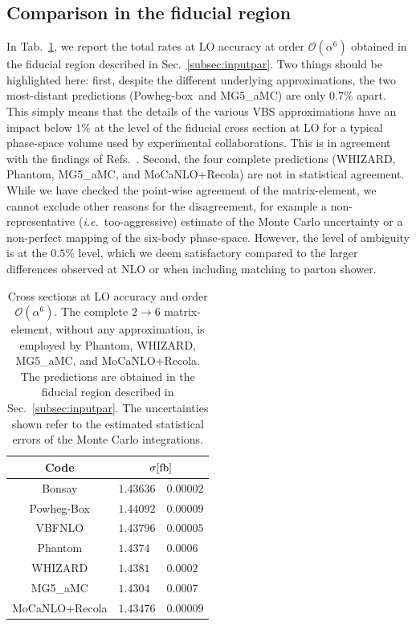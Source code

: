 \documentclass[twocolumn,epjc3]{svjour3} %
\begin{document}
    \subsection{Comparison in the fiducial region}
    In Tab.~\ref{tab:wg1_LOrates}, we report the total rates at LO accuracy at order $\mathcal O (\alpha^6)$ obtained in the fiducial region 
    described in Sec.~\ref{subsec:inputpar}. Two things should be highlighted here: first, despite the different underlying approximations, 
    the two most-distant predictions ({\sc Powheg-box}\ and {\sc MG5\_aMC}) are only $0.7\%$ apart. This simply means that the details 
    of the various VBS approximations have an impact below $1\%$ at the level of the fiducial cross section at LO for a 
    typical phase-space volume used by experimental collaborations. This is in agreement with the findings of 
    Refs.~\cite{Denner:2012dz,Oleari:2003tc}. Second, the four complete predictions ({\sc WHIZARD}, {\sc Phantom}, {\sc MG5\_aMC}, 
    and {\sc MoCaNLO+Recola}) are not in statistical agreement. While we have checked the point-wise agreement of the matrix-element, 
    we cannot exclude other reasons for the disagreement, for example a non-representative (\emph{i.e.}\ too-aggressive) 
    estimate of the Monte Carlo uncertainty or a non-perfect mapping of the six-body phase-space. However, the level of ambiguity is at the $0.5\%$ level, which 
    we deem satisfactory compared to the larger differences observed at NLO or when including matching to parton shower. 
    \begin{table}
        \centering
        \begin{tabular}{c|r@{ $\pm$ }l}
          Code  &  \multicolumn{2}{c}{$\sigma[\rm{fb}]$}  \\
            \hline
            \hline
            {\sc Bonsay}  &  $1.43636$ & $0.00002$ \\
            {\sc Powheg-Box}  &  $1.44092$ & $0.00009$ \\
            {\sc VBFNLO}  &  $1.43796$ & $0.00005$ \\
            {\sc Phantom} &  $1.4374\phantom{0}$ & $0.0006 $  \\
            {\sc WHIZARD} &  $1.4381\phantom{0}$ & $0.0002 $ \\
            {\sc MG5\_aMC}&  $1.4304\phantom{0}$ & $0.0007$ \\
            {\sc MoCaNLO+Recola}  &  $1.43476$ & $0.00009$ 
        \end{tabular}
        \caption{\label{tab:wg1_LOrates} Cross sections at LO accuracy and order $\mathcal{O}(\alpha^6)$.
        The complete $2\to 6$ matrix-element, without any approximation, is employed by {\sc Phantom},
        {\sc WHIZARD}, {\sc MG5\_aMC}, and {\sc MoCaNLO+Recola}. The predictions are obtained 
        in the fiducial region described in Sec.~\protect\ref{subsec:inputpar}.
        The uncertainties shown refer to the estimated statistical errors of the Monte Carlo integrations.}
    \end{table}
\end{document}

